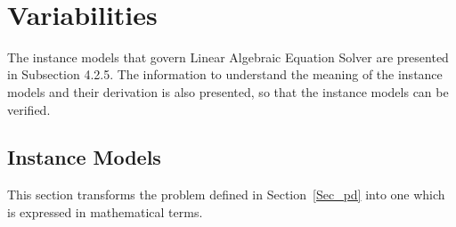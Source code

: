\documentclass[12pt]{article}
\newcommand{\progname}{Linear Algebraic Equation Solver} %
\begin{document}
~\newline


\section{Variabilities}

The instance models that govern \progname{} are presented in
Subsection 4.2.5.  The information to understand the meaning of the
instance models and their derivation is also presented, so that the instance
models can be verified.




\subsection{Instance Models} \label{sec_instance}    

This section transforms the problem defined in Section~\ref{Sec_pd} into 
one which is expressed in mathematical terms. 

~\newline

\end{document}

